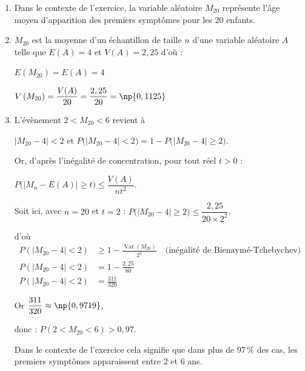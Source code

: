 \begin{enumerate}
	\item Dans le contexte de l'exercice, la variable aléatoire $M_{20}$ représente l'âge moyen d'apparition des premiers symptômes pour les 20 enfants.
	\item  $M_{20}$ est la moyenne d'un échantillon de taille $n$ d'une variable aléatoire $A$ telle que $E(A)=4$ et $V(A)=2,25$ d'où :

$E\left(M_{20}\right) = E(A)= 4$


$V\left(M_{20}\right) = \dfrac{V(A)}{20}=\dfrac{2,25}{20} = \np{0,1125}$

	\item L'évènement \og $2<M_{20}< 6$ \fg{} revient à 
	
$\big|M_{20} - 4 \big| < 2$ et $P\Big(\big|M_{20} - 4 \big| < 2\Big) = 1 - P\Big(\big|M_{20} - 4 \big| \geqslant 2\Big)$.

Or, d'après l'inégalité de concentration, pour tout réel $t > 0$ : 

$P\Big(\big|M_n - E(A)\big| \geqslant t \Big) \leqslant \dfrac{V(A)}{nt^2}$.

Soit ici, avec $n=20$ et $t =2$ : $P\Big(\big|M_{20} - 4 \big| \geqslant 2\Big) \leqslant \dfrac{2,25}{20 \times 2^2}$,

d'où \[
\begin{aligned}
P\left( \left| M_{20} - 4 \right| < 2 \right)
&\geqslant 1 - \frac{\operatorname{Var}(M_{20})}{2^2} \quad \text{(inégalité de Bienaymé-Tchebychev)} \\
P\left( \left| M_{20} - 4 \right| < 2 \right)&= 1 - \frac{2,25}{80} \\
P\left( \left| M_{20} - 4 \right| < 2 \right)&= \frac{311}{320}
\end{aligned}
\]

Or $\dfrac{311}{320}\approx \np{0,9719}$,

donc : $ P(2 < M_{20} < 6) > 0,97.$

Dans le contexte de l'exercice cela signifie que dans plus de 97\,\% des cas, les premiers symptômes apparaissent entre 2 et 6 ans.
\end{enumerate}

\medskip
